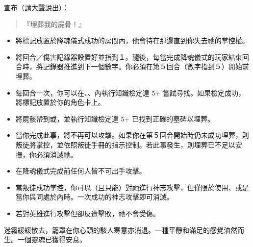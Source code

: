 宣布（請大聲說出）：
\begin{quote}
  『埋葬我的屍骨！』
\end{quote}
\vspace*{-1em}
\begin{itemize}
  \item 將標記放置於降魂儀式成功的房間內，他會待在那邊直到你失去祂的掌控權。
  \item 將回合／傷害記錄器設置好並指到１。隨後，每當完成降魂儀式的玩家結束回合時，將記錄器推進到下一個數字。你必須在第５回合（數字指到５）開始前埋葬。
  \item 每回合一次，你可以在、、內執行知識檢定達 5+ 嘗試尋找。如果檢定成功，將標記放置於你的角色卡上。
  \item 將屍骸帶到或，並執行知識檢定達 5+ 已找到正確的墓碑以埋葬。
  \item 當你完成此事，將不再可以攻擊。如果你在第５回合開始時仍未成功埋葬，則叛徒將掌控，並依照叛徒手冊的指示控制。若此事發生，則埋葬已不足以安撫，你必須消滅祂。
\end{itemize}

\vspace*{-1em}
\begin{itemize}
  \item 在降魂儀式完成前任何人皆不可出手攻擊。
  \item 當叛徒成功掌控，你可以（且只能）對祂進行神志攻擊，但僅限於使用、或是當你與同處於內時。一次成功的神志攻擊即可消滅。
  \item 若對英雄進行攻擊但卻反遭擊敗，祂不會受傷。
\end{itemize}

\begin{HauntStory}
  迷霧緩緩散去，籠罩在你心頭的駭人寒意亦消退。一種平靜和滿足的感覺油然而生。一個靈魂已獲得安息。
\end{HauntStory}
